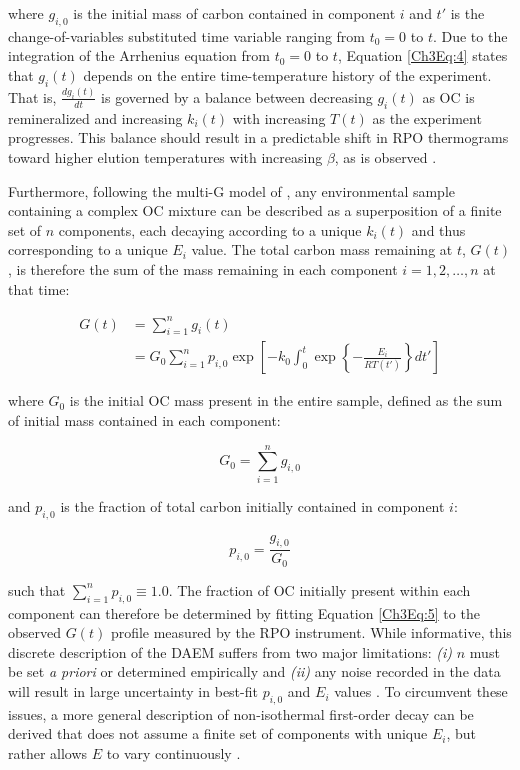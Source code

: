 where $g_{i,0}$ is the initial mass of carbon contained in component $i$ and $t'$ is the change-of-variables substituted time variable ranging from $t_{0} = 0$ to $t$. Due to the integration of the Arrhenius equation from $t_{0} = 0$ to $t$, Equation \ref{Ch3Eq:4} states that $g_{i}(t)$ depends on the entire time-temperature history of the experiment. That is, $\frac{dg_{i}(t)}{dt}$ is governed by a balance between decreasing $g_{i}(t)$ as OC is remineralized and increasing $k_{i}(t)$ with increasing $T(t)$ as the experiment progresses. This balance should result in a predictable shift in RPO thermograms toward higher elution temperatures with increasing $\beta$, as is observed \citep[Figure \ref{Ch3Fig:3}C;][]{Braun:1987vf,Miura:1995uo,Miura:1998jf}.

Furthermore, following the multi-G model of \citet{Westrich:1984uj}, any environmental sample containing a complex OC mixture can be described as a superposition of a finite set of $n$ components, each decaying according to a unique $k_{i}(t)$ and thus corresponding to a unique $E_{i}$ value. The total carbon mass remaining at $t$, $G(t)$, is therefore the sum of the mass remaining in each component $i = 1,2,\dots,n$ at that time:

\begin{equation}\label{Ch3Eq:5}
	\begin{split}
		G(t) & = \sum_{i=1}^{n} g_{i}(t) \\
		& =  G_{0} \sum_{i=1}^{n} p_{i,0} \exp \left[ - k_{0} \int_{0}^{t} \exp \left\{ - \frac{E_{i}}{RT(t')} \right\} dt' \right]
	\end{split}
\end{equation}

where $G_{0}$ is the initial OC mass present in the entire sample, defined as the sum of initial mass contained in each component:

\begin{equation}\label{Ch3Eq:6}
	G_{0} = \sum_{i=1}^{n} g_{i,0}
\end{equation}

and $p_{i,0}$ is the fraction of total carbon initially contained in component $i$:

\begin{equation}\label{Ch3Eq:7}
	p_{i,0} = \frac{g_{i,0}}{G_{0}}
\end{equation}

such that $\sum_{i=1}^{n} p_{i,0} \equiv 1.0$. The fraction of OC initially present within each component can therefore be determined by fitting Equation \ref{Ch3Eq:5} to the observed $G(t)$ profile measured by the RPO instrument. While informative, this discrete description of the DAEM suffers from two major limitations: \textit{(i)} $n$ must be set \textit{a priori} or determined empirically \citep{Boudreau:1991wf} and \textit{(ii)} any noise recorded in the data will result in large uncertainty in best-fit $p_{i,0}$ and $E_{i}$ values \citep{Forney:2012hz}. To circumvent these issues, a more general description of non-isothermal first-order decay can be derived that does not assume a finite set of components with unique $E_{i}$, but rather allows $E$ to vary continuously \citep{Burnham:1987ut,Burnham:1999ec,Cramer:2004tg}.


